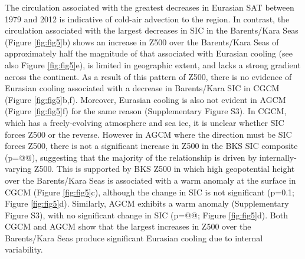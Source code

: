 \documentclass{nature}
\begin{document}
The circulation associated with the greatest decreases in Eurasian SAT between 1979 and 2012 is indicative of cold-air advection to the region. In contrast, the circulation associated with the largest decreases in SIC in the Barents/Kara Seas (Figure \ref{fig:fig5}b) shows an increase in Z500 over the Barents/Kara Seas of approximately half the magnitude of that associated with Eurasian cooling (see also Figure \ref{fig:fig5}e), is limited in geographic extent, and lacks a strong gradient across the continent. As a result of this pattern of Z500, there is no evidence of Eurasian cooling associated with a decrease in Barents/Kara SIC in CGCM (Figure \ref{fig:fig5}b,f). Moreover, Eurasian cooling is also not evident in AGCM (Figure \ref{fig:fig5}f) for the same reason (Supplementary Figure S3). In CGCM, which has a freely-evolving atmosphere and sea ice, it is unclear whether SIC forces Z500 or the reverse. However in AGCM where the direction must be SIC forces Z500, there is not a significant increase in Z500 in the BKS SIC composite (p=@@), suggesting that the majority of the relationship is driven by internally-varying Z500. This is supported by BKS Z500 in which high geopotential height over the Barents/Kara Seas is associated with a warm anomaly at the surface in CGCM (Figure \ref{fig:fig5}c), although the change in SIC is not significant (p=0.1; Figure \ref{fig:fig5}d). Similarly, AGCM exhibits a warm anomaly (Supplementary Figure S3), with no significant change in SIC (p=@@; Figure \ref{fig:fig5}d). Both CGCM and AGCM show that the largest increases in Z500 over the Barents/Kara Seas produce significant Eurasian cooling due to internal variability.

\end{document}
